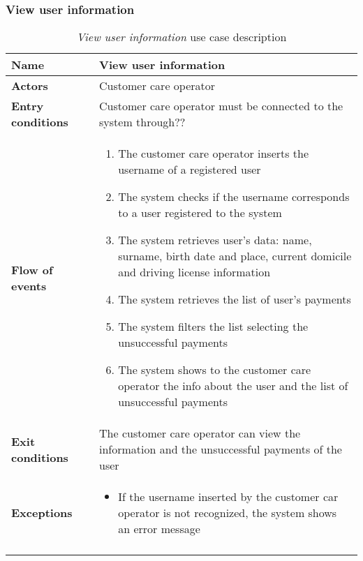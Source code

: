 \clearpage
\subsubsection{View user information}
\begin{longtable}{p{0.25\linewidth}p{0.75\linewidth}}
\toprule
\textbf{Name} & \textbf{View user information} \\
\midrule
\textbf{Actors} &  Customer care operator\\
\midrule
\textbf{Entry conditions} & Customer care operator must be connected to the system through??\\
\midrule
\textbf{Flow of events} & 
\begin{enumerate}
	\item The customer care operator inserts the username of a registered user
	\item The system checks if the username corresponds to a user registered to the system
	\item The system retrieves user's data: name, surname, birth date and place, current domicile
	and driving license information 
	\item The system retrieves the list of user's payments
	\item The system filters the list selecting the unsuccessful payments
	\item The system shows to the customer care operator the info about the user and the list of unsuccessful payments
\end{enumerate} \\
\midrule
\textbf{Exit conditions} & The customer care operator can view the information and the unsuccessful payments of the user \\
\midrule
\textbf{Exceptions} & 
\begin{itemize}
	\item If the username inserted by the customer car operator is not recognized, the system shows an error message
\end{itemize} \\
\bottomrule
\caption{\emph{View user information} use case description}
\end{longtable}

\clearpage
